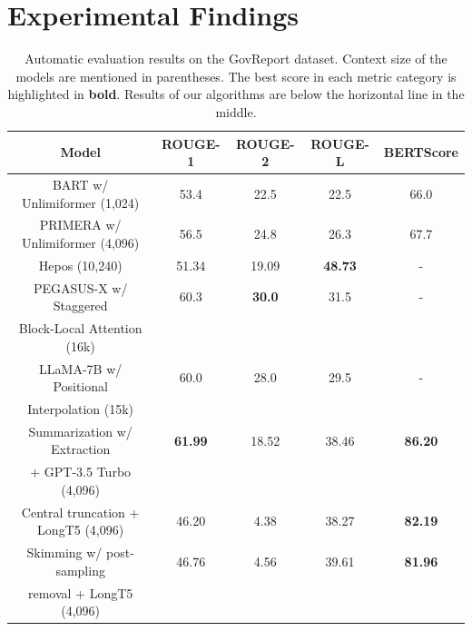 \section{Experimental Findings}
\label{sec:findings}


\begin{table}[!ht]
  \centering

  \begin{tabular}{c c c c c}
    \hline
    Model & ROUGE-1 & ROUGE-2 & ROUGE-L & BERTScore \\
    \hline
    BART w/ Unlimiformer (1,024) & 53.4 & 22.5 & 22.5 & 66.0 \\
    PRIMERA w/ Unlimiformer (4,096) & 56.5 & 24.8 & 26.3 & 67.7 \\
    Hepos (10,240) & 51.34 & 19.09 & \textbf{48.73} & - \\
    PEGASUS-X w/ Staggered & 60.3 & \textbf{30.0} & 31.5 & - \\
    Block-Local Attention (16k) & & & & \\
    LLaMA-7B w/ Positional & 60.0 & 28.0 & 29.5 & - \\
    Interpolation (15k) & & & & \\
    \hline
    Summarization w/ Extraction & \textbf{61.99} & 18.52 & 38.46 & \textbf{86.20} \\
    + GPT-3.5 Turbo (4,096) & & & & \\
    Central truncation + LongT5 (4,096) & 46.20 & 4.38 & 38.27 & \textbf{82.19} \\
    Skimming w/ post-sampling & 46.76 & 4.56 & 39.61 & \textbf{81.96} \\
    removal + LongT5 (4,096) & & & & \\
    \hline
  \end{tabular}

  \caption{
    Automatic evaluation results on the GovReport dataset. Context size of the models are mentioned in parentheses.
    The best score in each metric category is highlighted in \textbf{bold}.
    Results of our algorithms are below the horizontal line in the middle.
  }
  \label{tab:govreport}
\end{table}

